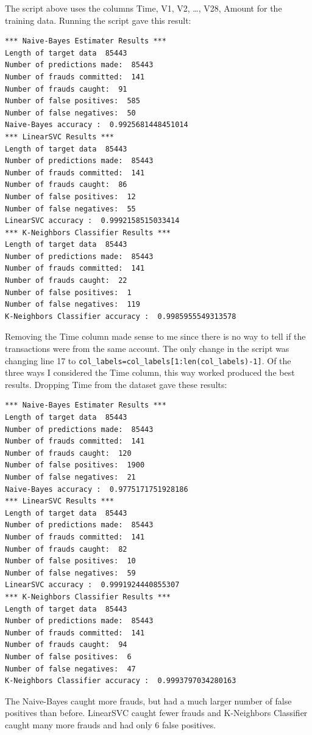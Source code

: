 \documentclass{article}
\begin{document}
\bigskip
The script above uses the columns Time, V1, V2, \dots, V28, Amount for the training data.  Running the script gave this result:
\begin{lstlisting}
*** Naive-Bayes Estimater Results ***
Length of target data  85443
Number of predictions made:  85443
Number of frauds committed:  141
Number of frauds caught:  91
Number of false positives:  585
Number of false negatives:  50
Naive-Bayes accuracy :  0.9925681448451014
*** LinearSVC Results ***
Length of target data  85443
Number of predictions made:  85443
Number of frauds committed:  141
Number of frauds caught:  86
Number of false positives:  12
Number of false negatives:  55
LinearSVC accuracy :  0.9992158515033414
*** K-Neighbors Classifier Results ***
Length of target data  85443
Number of predictions made:  85443
Number of frauds committed:  141
Number of frauds caught:  22
Number of false positives:  1
Number of false negatives:  119
K-Neighbors Classifier accuracy :  0.9985955549313578
\end{lstlisting}
Removing the Time column made sense to me since there is no way to tell if the transactions were from the same account.  The only change in the script was changing line 17 to \texttt{col{\_}labels=col{\_}labels[1:len(col{\_}labels)-1]}. Of the three ways I considered the Time column, this way worked produced the best results.  Dropping Time from the dataset gave these results:
\begin{lstlisting}
*** Naive-Bayes Estimater Results ***
Length of target data  85443
Number of predictions made:  85443
Number of frauds committed:  141
Number of frauds caught:  120
Number of false positives:  1900
Number of false negatives:  21
Naive-Bayes accuracy :  0.9775171751928186
*** LinearSVC Results ***
Length of target data  85443
Number of predictions made:  85443
Number of frauds committed:  141
Number of frauds caught:  82
Number of false positives:  10
Number of false negatives:  59
LinearSVC accuracy :  0.9991924440855307
*** K-Neighbors Classifier Results ***
Length of target data  85443
Number of predictions made:  85443
Number of frauds committed:  141
Number of frauds caught:  94
Number of false positives:  6
Number of false negatives:  47
K-Neighbors Classifier accuracy :  0.9993797034280163
\end{lstlisting}

The Naive-Bayes caught more frauds, but had a much larger number of false positives than before. LinearSVC caught fewer frauds and K-Neighbors Classifier caught many more frauds and had only 6 false positives.  
\end{document}
